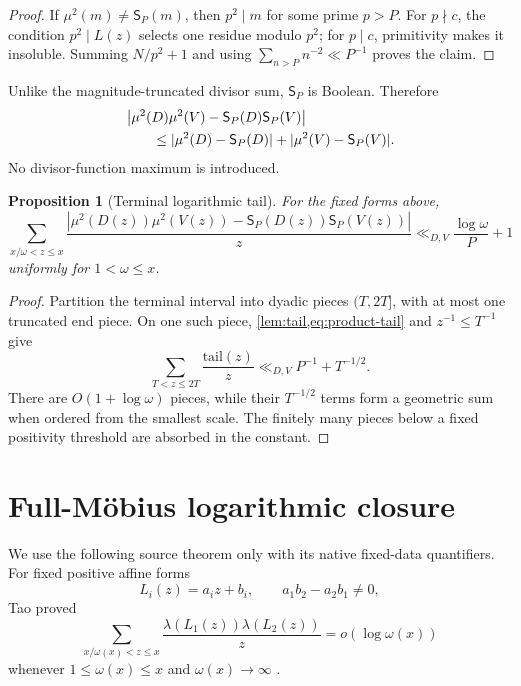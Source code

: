 \documentclass[11pt]{article}
\newtheorem{proposition}[theorem]{Proposition}
\theoremstyle{definition}
\theoremstyle{remark}
\begin{document}
\begin{proof}
If \(\mu^2(m)\ne\mathsf S_P(m)\), then \(p^2\mid m\) for some
prime \(p>P\).  For \(p\nmid c\), the condition
\(p^2\mid L(z)\) selects one residue modulo \(p^2\); for
\(p\mid c\), primitivity makes it insoluble.  Summing
\(N/p^2+1\) and using
\(\sum_{n>P}n^{-2}\ll P^{-1}\) proves the claim.
\end{proof}

Unlike the magnitude-truncated divisor sum, \(\mathsf S_P\) is
Boolean.  Therefore
\begin{align}
 &\left|
 \mu^2(D)\mu^2(V)
 -\mathsf S_P(D)\mathsf S_P(V)
 \right|
\notag\\
 &\qquad\le
 |\mu^2(D)-\mathsf S_P(D)|
 +|\mu^2(V)-\mathsf S_P(V)|.
\label{eq:product-tail}
\end{align}
No divisor-function maximum is introduced.

\begin{proposition}[Terminal logarithmic tail]
\label{prop:log-tail}
For the fixed forms above,
\begin{equation}
 \sum_{x/\omega<z\le x}
 \frac{
 |\mu^2(D(z))\mu^2(V(z))
 -\mathsf S_P(D(z))\mathsf S_P(V(z))|}
 {z}
 \ll_{D,V}
 \frac{\log\omega}{P}+1
\label{eq:log-tail}
\end{equation}
uniformly for \(1<\omega\le x\).
\end{proposition}

\begin{proof}
Partition the terminal interval into dyadic pieces
\((T,2T]\), with at most one truncated end piece.  On one such
piece, \cref{lem:tail,eq:product-tail} and \(z^{-1}\le T^{-1}\)
give
\[
 \sum_{T<z\le2T}\frac{\text{tail}(z)}z
 \ll_{D,V}P^{-1}+T^{-1/2}.
\]
There are \(O(1+\log\omega)\) pieces, while their \(T^{-1/2}\)
terms form a geometric sum when ordered from the smallest scale.
The finitely many pieces below a fixed positivity threshold are
absorbed in the constant.
\end{proof}

\section{Full-M\"obius logarithmic closure}

We use the following source theorem only with its native fixed-data
quantifiers.  For fixed positive affine forms
\[
 L_i(z)=a_i z+b_i,\qquad
 a_1b_2-a_2b_1\ne0,
\]
Tao proved
\begin{equation}
 \sum_{x/\omega(x)<z\le x}
 \frac{\lambda(L_1(z))\lambda(L_2(z))}{z}
 =
 o(\log\omega(x))
\label{eq:tao}
\end{equation}
whenever \(1\le\omega(x)\le x\) and
\(\omega(x)\to\infty\) \citep{Tao2016LogChowla}.
\end{document}
